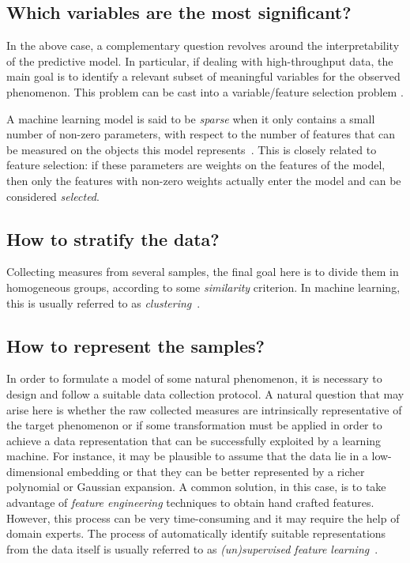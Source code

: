 \subsection{Which variables are the most significant?} %
In the above case, a complementary question revolves around the interpretability of the predictive model. In particular, if dealing with high-throughput data, the main goal is to identify a relevant subset of meaningful variables for the observed phenomenon. This problem can be cast into a variable/feature selection problem \cite{guyon2002gene}. %

A machine learning model is said to be \textit{sparse} when it only contains a small number of non-zero parameters, with respect to the number of features that can be measured on the objects this model represents~\cite{hastie2015statistical, meier2008group}. This is closely related to feature selection: if these parameters are weights on the features of the model, then only the features with non-zero weights actually enter the model and can be considered \textit{selected}.

\subsection{How to stratify the data?} %
Collecting measures from several samples, the final goal here is to divide them in homogeneous groups, according to some \textit{similarity} criterion. In machine learning, this is usually referred to as \textit{clustering}~\cite{hastie2009elements}.

\subsection{How to represent the samples?} %
In order to formulate a model of some natural phenomenon, it is necessary to design and follow a suitable data collection protocol. A natural question that may arise here is whether the raw collected measures are intrinsically representative of the target phenomenon or if some transformation must be applied in order to achieve a data representation that can be successfully exploited by a learning machine. For instance, it may be plausible to assume that the data lie in a low-dimensional embedding or that they can be better represented by a richer polynomial or Gaussian expansion.
A common solution, in this case, is to take advantage of \textit{feature engineering} techniques to obtain hand crafted features. However, this process can be very time-consuming and it may require the help of domain experts. The process of automatically identify suitable representations from the data itself is usually referred to as \textit{(un)supervised feature learning}~\cite{angermueller2016deep, mamoshina2016applications}.

